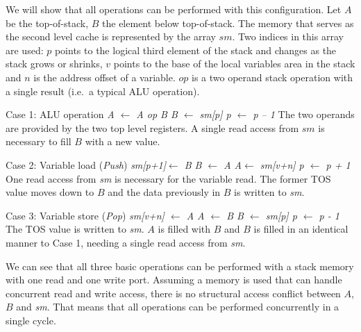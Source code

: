 We will show that all operations can be performed with this
configuration. Let $A$ be the top-of-stack, $B$ the element below
top-of-stack. The memory that serves as the second level cache is
represented by the array $sm$. Two indices in this array are used:
$p$ points to the logical third element of the stack and changes as
the stack grows or shrinks, $v$ points to the base of the local
variables area in the stack and $n$ is the address offset of a
variable. $op$ is a two operand stack operation with a single result
(i.e.\ a typical ALU operation).


\begin{description}
\begin{samepage}
\item[Case 1:]
ALU operation \newline \textit{A $\leftarrow $ A op B
\newline B $\leftarrow $ sm[p] \newline p $\leftarrow $ p -- 1
\newline }The two operands are provided by the two top level
registers. A single read access from $sm$ is necessary to fill $B$
with a new value.
\end{samepage}
%
\begin{samepage}
\item[Case 2:]
    Variable load (\textit{Push}) \newline
    \textit{
    sm[p+1]$\leftarrow $ B \newline
    B $\leftarrow $ A \newline
    A$\leftarrow $ sm[v+n] \newline
    p $\leftarrow $ p + 1 \newline
    }
    One read access from \textit{sm} is necessary for the variable read. The
former TOS value moves down to $B$ and the data previously in $B$ is
written to \textit{sm}.
\end{samepage}
%
\begin{samepage}
\item[Case 3:]
    Variable store (\textit{Pop}) \newline
    \textit{sm[v+n] $\leftarrow $ A \newline
    A $\leftarrow $ B \newline
    B $\leftarrow $ sm[p] \newline
    p $\leftarrow $ p - 1 \newline }
    The TOS value is written to \textit{sm}. $A$ is filled with $B$ and $B$ is filled in an
identical manner to Case 1, needing a single read access from
\textit{sm}.
\end{samepage}
\end{description}
%
We can see that all three basic operations can be performed with a
stack memory with one read and one write port. Assuming a memory is
used that can handle concurrent read and write access, there is no
structural access conflict between $A$, $B$ and \textit{sm}. That
means that all operations can be performed concurrently in a single
cycle.

